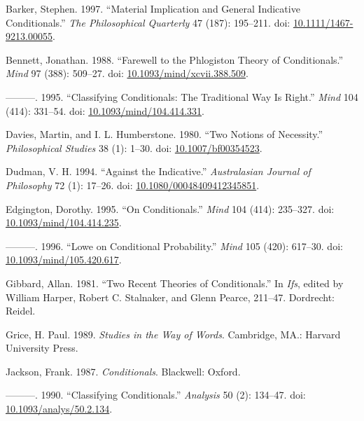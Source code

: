 \documentclass[
  10pt,
  letterpaper,
  DIV=11,
  numbers=noendperiod,
  twoside]{scrartcl}
\newlength{\cslhangindent}
\newenvironment{CSLReferences}[2] %
 {\begin{list}{}{%
  \setlength{\itemindent}{0pt}
  \setlength{\leftmargin}{0pt}
  \setlength{\parsep}{0pt}
  \ifodd #1
   \setlength{\leftmargin}{\cslhangindent}
   \setlength{\itemindent}{-1\cslhangindent}
  \fi
  \setlength{\itemsep}{#2\baselineskip}}}
 {\end{list}}
\begin{document}
\label{refs}
\begin{CSLReferences}{1}{0}
Barker, Stephen. 1997. {``Material Implication and General Indicative
Conditionals.''} \emph{The Philosophical Quarterly} 47 (187): 195--211.
doi:
\href{https://doi.org/10.1111/1467-9213.00055}{10.1111/1467-9213.00055}.

Bennett, Jonathan. 1988. {``Farewell to the Phlogiston Theory of
Conditionals.''} \emph{Mind} 97 (388): 509--27. doi:
\href{https://doi.org/10.1093/mind/xcvii.388.509}{10.1093/mind/xcvii.388.509}.

---------. 1995. {``Classifying Conditionals: The Traditional Way Is
Right.''} \emph{Mind} 104 (414): 331--54. doi:
\href{https://doi.org/10.1093/mind/104.414.331}{10.1093/mind/104.414.331}.

Davies, Martin, and I. L. Humberstone. 1980. {``Two Notions of
Necessity.''} \emph{Philosophical Studies} 38 (1): 1--30. doi:
\href{https://doi.org/10.1007/bf00354523}{10.1007/bf00354523}.

Dudman, V. H. 1994. {``Against the Indicative.''} \emph{Australasian
Journal of Philosophy} 72 (1): 17--26. doi:
\href{https://doi.org/10.1080/00048409412345851}{10.1080/00048409412345851}.

Edgington, Dorothy. 1995. {``On Conditionals.''} \emph{Mind} 104 (414):
235--327. doi:
\href{https://doi.org/10.1093/mind/104.414.235}{10.1093/mind/104.414.235}.

---------. 1996. {``Lowe on Conditional Probability.''} \emph{Mind} 105
(420): 617--30. doi:
\href{https://doi.org/10.1093/mind/105.420.617}{10.1093/mind/105.420.617}.

Gibbard, Allan. 1981. {``Two Recent Theories of Conditionals.''} In
\emph{Ifs}, edited by William Harper, Robert C. Stalnaker, and Glenn
Pearce, 211--47. Dordrecht: Reidel.

Grice, H. Paul. 1989. \emph{Studies in the Way of Words}. Cambridge,
MA.: Harvard University Press.

Jackson, Frank. 1987. \emph{Conditionals}. Blackwell: Oxford.

---------. 1990. {``Classifying Conditionals.''} \emph{Analysis} 50 (2):
134--47. doi:
\href{https://doi.org/10.1093/analys/50.2.134}{10.1093/analys/50.2.134}.


\end{CSLReferences}
\end{document}
